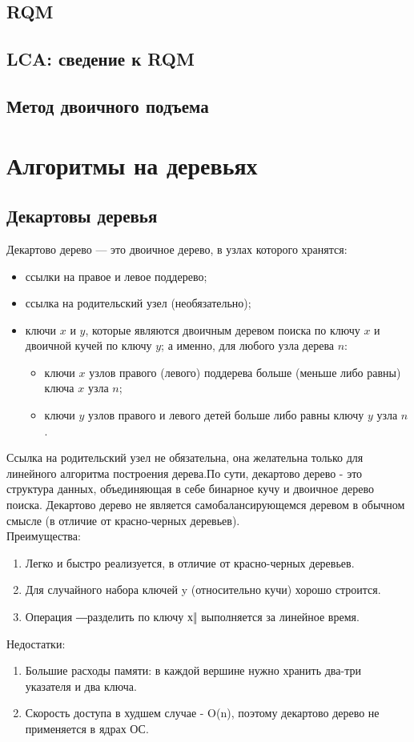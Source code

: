 \documentclass[a4paper]{article}
\begin{document}
\subsection{RQM}
\subsection{LCA: сведение к RQM}
\subsection{Метод двоичного подъема}

\section{Алгоритмы на деревьях}
\subsection{Декартовы деревья}
Декартово дерево — это двоичное дерево, в узлах которого хранятся:
\begin{itemize}
	\item ссылки на правое и левое поддерево;
	\item ссылка на родительский узел (необязательно);
	\item ключи $x$ и $y$, которые являются двоичным деревом поиска по ключу $x$ и двоичной кучей по ключу $y$; а именно, для любого узла дерева $n$:
	\begin{itemize}
		\item ключи $x$ узлов правого (левого) поддерева больше (меньше либо равны) ключа $x$ узла $n$;
		\item ключи $y$ узлов правого и левого детей больше либо равны ключу $y$ узла $n$.
	\end{itemize}
\end{itemize}
Ссылка на родительский узел не обязательна, она желательна только для линейного алгоритма построения дерева.По сути, декартово дерево - это структура данных, объединяющая в себе бинарное кучу и двоичное дерево поиска. Декартово дерево не является самобалансирующемся деревом в обычном смысле (в
отличие от красно-черных деревьев). \\
Преимущества:\begin{enumerate}
	\item Легко и быстро реализуется, в отличие от красно-черных деревьев.
	\item Для случайного набора ключей y (относительно кучи) хорошо строится.
	\item Операция ―разделить по ключу х‖ выполняется за линейное время.
\end{enumerate}
Недостатки: \begin{enumerate}
	\item Большие расходы памяти: в каждой вершине нужно хранить два-три указателя и два ключа.
	\item Скорость доступа в худшем случае - O(n), поэтому декартово дерево не применяется в ядрах ОС.
\end{enumerate}
\end{document}
